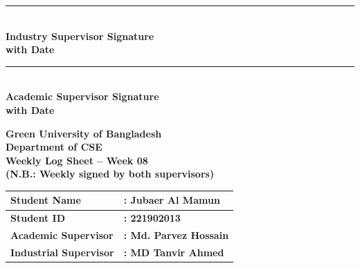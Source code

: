 \documentclass[a4paper,11pt]{article}
\begin{document}
\noindent
\begin{minipage}[t]{0.45\textwidth}
\rule{0.8\textwidth}{0.4pt} \\
\textbf{Industry Supervisor Signature} \\
\textbf{with Date}
\end{minipage}
\hfill
\begin{minipage}[t]{0.45\textwidth}
\rule{0.8\textwidth}{0.4pt} \\
\textbf{Academic Supervisor Signature} \\
\textbf{with Date}
\end{minipage}

\newpage

\begin{center}
    {\Large \textbf{Green University of Bangladesh}} \\[0.5em]
    {\large \textbf{Department of CSE}} \\[0.5em]
    {\large \textbf{Weekly Log Sheet -- Week 08}} \\[0.5em]
    {\color{red} \textbf{(N.B.: Weekly signed by both supervisors)}}
\end{center}

\vspace{1em}

\begin{tabularx}{\textwidth}{|l|X|}
\hline
\textbf{Student Name} & \textbf{: Jubaer Al Mamun} \\ \hline
\textbf{Student ID} & \textbf{: 221902013} \\ \hline
\textbf{Academic Supervisor} & \textbf{: Md. Parvez Hossain} \\ \hline
\textbf{Industrial Supervisor} & \textbf{: MD Tanvir Ahmed} \\ \hline
\end{tabularx}

\vspace{1em}
\end{document}
